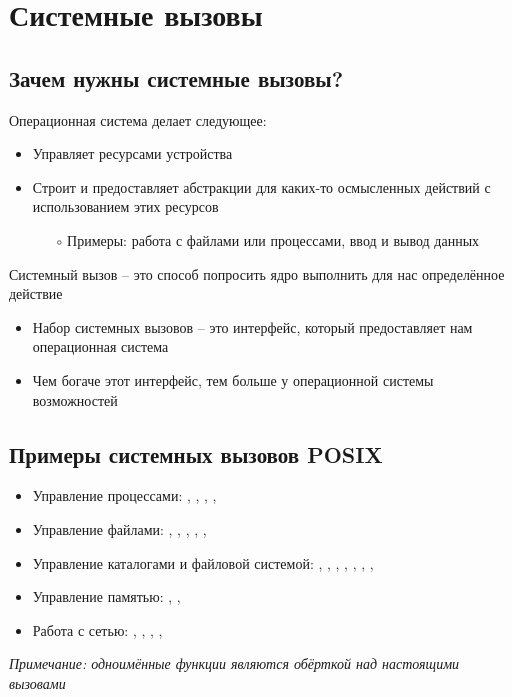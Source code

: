 \section{Системные вызовы}
  \subsection{Зачем нужны системные вызовы?}
    Операционная система делает следующее:

    \begin{itemize}
      \item Управляет ресурсами устройства
      \item Строит и предоставляет абстракции для каких-то осмысленных действий с использованием этих ресурсов \begin{itemize}
        \item[$\circ$] Примеры: работа с файлами или процессами, ввод и вывод данных
      \end{itemize}
    \end{itemize}
    
    Системный вызов -- это способ попросить ядро выполнить для нас определённое действие
    \begin{itemize}
      \item Набор системных вызовов -- это интерфейс, который предоставляет нам операционная система
      \item Чем богаче этот интерфейс, тем больше у операционной системы возможностей
    \end{itemize}
  
  \subsection{Примеры системных вызовов POSIX}
    \begin{itemize}
      \item Управление процессами: , , , , 
      \item Управление файлами: , , , , , 
      \item Управление каталогами и файловой системой: , , , , , , , 
      \item Управление памятью: , , 
      \item Работа с сетью: , , , , 
    \end{itemize}
    \textit{Примечание: одноимённые функции являются обёрткой над настоящими вызовами}
  
